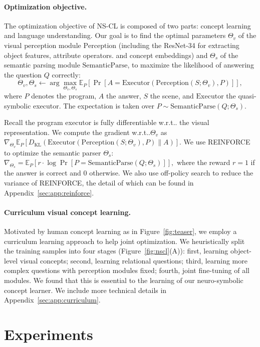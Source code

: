 \documentclass{article} \usepackage{iclr2019_conference,times}
\makeatletter
\newcommand{\E}{\mathbb{E}}
\newcommand{\KL}{D_{\mathrm{KL}}}
\newcommand{\fig}[1]{Figure~\ref{#1}}
\DeclareRobustCommand\onedot{\futurelet\@let@token\@onedot}
\def\@onedot{\ifx\@let@token.\else.\null\fi\xspace}
\def\wrt{w.r.t\onedot} \def\dof{d.o.f\onedot}
\newcommand{\modelfull}{neuro-symbolic concept learner\xspace}
\newcommand{\model}{NS-CL\xspace}
\newcommand{\myparagraph}[1]{\vspace{-3pt}\paragraph{#1}}
\makeatother
\begin{document}
\paragraph{Optimization objective.}

The optimization objective of \model is composed of two parts: concept learning and language understanding. Our goal is to find the optimal parameters $\Theta_{v}$ of the visual perception module $\mathrm{Perception}$ (including the ResNet-34 for extracting object features, attribute operators. and concept embeddings) and $\Theta_{s}$ of the semantic parsing module $\mathrm{SemanticParse}$, to maximize the likelihood of answering the question $Q$ correctly:
\begin{equation}
     \Theta_v, \Theta_s \leftarrow \arg \max_{\Theta_v, \Theta_s} \E_{P}[ \Pr[ A= \mathrm{Executor}(\mathrm{Perception}(S; {\Theta_v}), P)] ], \label{eq:reward}
\end{equation}
where $P$ denotes the program, $A$ the answer, $S$ the scene, and $\mathrm{Executor}$ the quasi-symbolic executor. The expectation is taken over $P \sim \mathrm{SemanticParse}(Q; {\Theta_s})$.

Recall the program executor is fully differentiable \wrt the visual representation. We compute the gradient \wrt $\Theta_v$ as
$ \nabla_{\Theta_v} \E_{P}[\KL(\mathrm{Executor}(\mathrm{Perception}({S}; \Theta_v), P) \| A)]$. We use REINFORCE~\citep{Williams1992Simple} to optimize  the semantic parser $\Theta_s$:
$\nabla_{\Theta_s} = \E_{P}[ r \cdot \log \Pr[P = \mathrm{SemanticParse}(Q; {\Theta_s})]], $
where the reward $r=1$ if the answer is correct and 0 otherwise. We also use off-policy search to reduce the variance of REINFORCE, the detail of which can be found in Appendix~\ref{sec:app:reinforce}.

\myparagraph{Curriculum visual concept learning.}
\label{subsec:curriculum}
Motivated by human concept learning as in \fig{fig:teaser}, we employ a curriculum learning approach to help joint optimization. We heuristically split the training samples into four stages (\fig{fig:nscl}(A)): first, learning object-level visual concepts; second, learning relational questions; third, learning more complex questions with perception modules fixed; fourth, joint fine-tuning of all modules. We found that this is essential to the learning of our \modelfull.
We include more technical details in Appendix~\ref{sec:app:curriculum}.
\section{Experiments}
\end{document}
